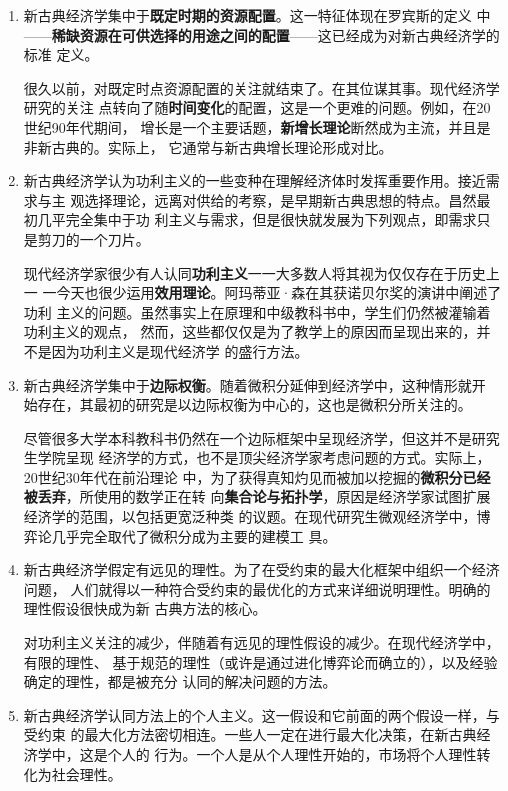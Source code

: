 \begin{enumerate}
\item 新古典经济学集中于\textbf{既定时期的资源配置}。这一特征体现在罗宾斯的定义
  中——\textbf{稀缺资源在可供选择的用途之间的配置}——这已经成为对新古典经济学的标准
  定义。

  很久以前，对既定时点资源配置的关注就结束了。在其位谋其事。现代经济学研究的关注
  点转向了随\textbf{时间变化}的配置，这是一个更难的问题。例如，在20世纪90年代期间，
  增长是一个主要话题，\textbf{新增长理论}断然成为主流，并且是非新古典的。实际上，
  它通常与新古典增长理论形成对比。

\item 新古典经济学认为功利主义的一些变种在理解经济体时发挥重要作用。接近需求与主
  观选择理论，远离对供给的考察，是早期新古典思想的特点。昌然最初几平完全集中于功
  利主义与需求，但是很快就发展为下列观点，即需求只是剪刀的一个刀片。

  现代经济学家很少有人认同\textbf{功利主义}一一大多数人将其视为仅仅存在于历史上一
  一今天也很少运用\textbf{效用理论}。阿玛蒂亚·森在其获诺贝尔奖的演讲中阐述了功利
  主义的问题。虽然事实上在原理和中级教科书中，学生们仍然被灌输着功利主义的观点，
  然而，这些都仅仅是为了教学上的原因而呈现出来的，并不是因为功利主义是现代经济学
  的盛行方法。

\item 新古典经济学集中于\textbf{边际权衡}。随着微积分延伸到经济学中，这种情形就开
  始存在，其最初的研究是以边际权衡为中心的，这也是微积分所关注的。

  尽管很多大学本科教科书仍然在一个边际框架中呈现经济学，但这并不是研究生学院呈现
  经济学的方式，也不是顶尖经济学家考虑问题的方式。实际上，20世纪30年代在前沿理论
  中，为了获得真知灼见而被加以挖掘的\textbf{微积分已经被丢弃}，所使用的数学正在转
  向\textbf{集合论与拓扑学}，原因是经济学家试图扩展经济学的范围，以包括更宽泛种类
  的议题。在现代研究生微观经济学中，博弈论几乎完全取代了微积分成为主要的建模工
  具。

\item 新古典经济学假定有远见的理性。为了在受约束的最大化框架中组织一个经济问题，
  人们就得以一种符合受约束的最优化的方式来详细说明理性。明确的理性假设很快成为新
  古典方法的核心。

  对功利主义关注的减少，伴随着有远见的理性假设的减少。在现代经济学中，有限的理性、
  基于规范的理性（或许是通过进化博弈论而确立的），以及经验确定的理性，都是被充分
  认同的解决问题的方法。

\item 新古典经济学认同方法上的个人主义。这一假设和它前面的两个假设一样，与受约束
  的最大化方法密切相连。一些人一定在进行最大化决策，在新古典经济学中，这是个人的
  行为。一个人是从个人理性开始的，市场将个人理性转化为社会理性。


\end{enumerate}
